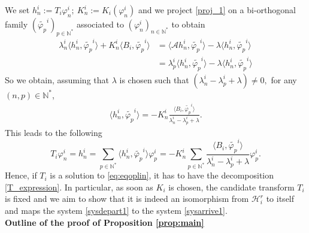 \documentclass[11pt, dvipsnames]{amsart}
\begin{document}
We set $h_n^i:=T_i\varphi_n^i;\ K_n^i:=K_i(\varphi_n^i)$ and we project \eqref{proj_1} on a bi-orthogonal family $(\widetilde{\varphi_p}^i)_{p\in\mathbb{N}^{*}}$ associated to $(\varphi_{n}^{i})_{n\in\mathbb{N}^{*}}$ to obtain
\begin{align*}
    \lambda_n^i \langle h_n^i,\widetilde{\varphi_p}^i\rangle+K_n^i\langle B_i,\widetilde{\varphi_p}^i\rangle&=\langle \mathcal{A}h_n^i,\widetilde{\varphi_p}^i\rangle-\lambda \langle h_n^i,\widetilde{\varphi_p}^i\rangle\\
    &=\lambda_p^i\langle h_n^i,\widetilde{\varphi_p}^i\rangle-\lambda \langle h_n^i,\widetilde{\varphi_p}^i\rangle
\end{align*}
 So we obtain, assuming that $\lambda$ is chosen such that $(\lambda_n^i-\lambda_p^i+\lambda)\neq 0,$ for any $(n,p)\in\mathbb{N}^*$,
 \begin{align*}
     \langle h_n^i,\widetilde{\varphi_p}^i\rangle=-K_n^i\frac{\langle B_i,\widetilde{\varphi_p}^i\rangle}{\lambda_n^i-\lambda_p^i+\lambda}.
 \end{align*}
 This leads to the following
 \begin{equation}
 \label{T_expression}
     T_i\varphi_n^i=h_n^i=\sum_{p\in \mathbb{N}^*}\langle h_n^i,\widetilde{\varphi_p}^i\rangle\varphi_p^i=-K_n^i\sum_{p\in \mathbb{N}^*}\frac{\langle B_i,\widetilde{\varphi_p}^i\rangle}{\lambda_n^i-\lambda_p^i+\lambda}\varphi_p^i.
 \end{equation}
Hence, if $T_{i}$ is a solution to \eqref{eq:eqoplin}, it has to have the decomposition \eqref{T_expression}. In particular, as soon as $K_{i}$ is chosen, the candidate transform $T_{i}$ is fixed and we aim to show that it is indeed an isomorphism from $\mathcal{H}^{r}_{i}$ to itself and maps the system \eqref{sysdepart1} to the system \eqref{sysarrive1}.\\

\noindent \textbf{Outline of the proof of Proposition \ref{prop:main}}
\vphantom{}\\
\end{document}
